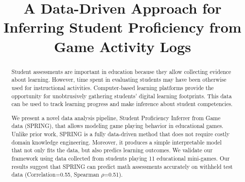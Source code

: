 \documentclass{sigchi}
\def\algname{SPRING\xspace}
\def\plaintitle{A Data-Driven Approach for Inferring Student Proficiency from Game Activity Logs  }
\begin{document}
	
	
	\title{\plaintitle}
	
	\author
	{%
	}
	
	
	\maketitle
	
	\begin{abstract}
		Student assessments are important in education because they allow collecting evidence about learning. 
		However,  time spent in  evaluating students may have been otherwise  used for instructional activities.
		Computer-based learning platforms provide the opportunity for unobtrusively gathering students' digital learning footprints.
		This data can be used to track learning progress and make inference about student competencies.
		
		We present a novel data analysis pipeline, {Student Proficiency Inferrer from Game data} (\algname), that allows modeling  game playing behavior in educational games.
		Unlike prior work, \algname is a fully data-driven method that does not require costly domain knowledge engineering.
		Moreover, it produces a simple interpretable model that not only fits the data, but also predics learning outcomes.
		We validate our framework using data collected from students playing 11 educational mini-games.
		Our results suggest that \algname can predict math assessments accurately on withheld test data (Correlation=0.55, Spearman $\rho$=0.51).
	\end{abstract}
	
\end{document}
